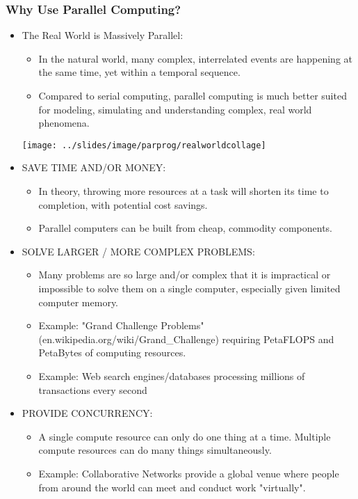 \documentclass[10pt,t]{beamer}
\begin{document}
\begin{frame}[allowframebreaks,c]
  \frametitle{Why Use Parallel Computing?}
  \begin{itemize}
  \item The Real World is Massively Parallel:
    \begin{itemize}
    \item In the natural world, many complex, interrelated events are happening at the same time, yet within a temporal sequence.
    \item Compared to serial computing, parallel computing is much better suited for modeling, simulating and understanding complex, real world phenomena.
    \end{itemize}
    \begin{center}
      \texttt{[image: ../slides/image/parprog/realworldcollage]}
    \end{center}
    \framebreak
  \item SAVE TIME AND/OR MONEY:
    \begin{itemize}
    \item In theory, throwing more resources at a task will shorten its time to completion, with potential cost savings.
    \item Parallel computers can be built from cheap, commodity components.
    \end{itemize}
  \item SOLVE LARGER / MORE COMPLEX PROBLEMS:
    \begin{itemize}
    \item Many problems are so large and/or complex that it is impractical or impossible to solve them on a single computer, especially given limited computer memory.
    \item Example: "Grand Challenge Problems" (en.wikipedia.org/wiki/Grand\_Challenge) requiring PetaFLOPS and PetaBytes of computing resources.
    \item Example: Web search engines/databases processing millions of transactions every second
    \end{itemize}
  \item PROVIDE CONCURRENCY:
    \begin{itemize}
    \item A single compute resource can only do one thing at a time. Multiple compute resources can do many things simultaneously.
    \item Example: Collaborative Networks provide a global venue where people from around the world can meet and conduct work "virtually".

\end{itemize}
\end{itemize}
\end{frame}
\end{document}
